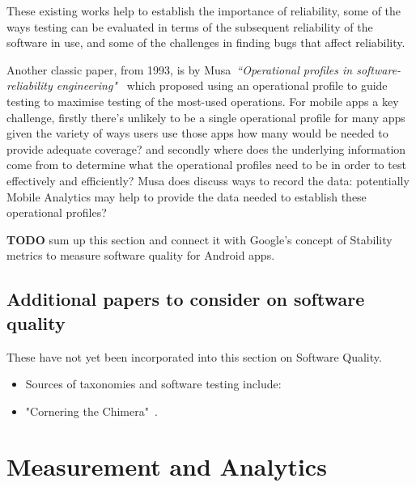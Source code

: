 These existing works help to establish the importance of reliability, some of the ways testing can be evaluated in terms of the subsequent reliability of the software in use, and some of the challenges in finding bugs that affect reliability. 

Another classic paper, from 1993, is by Musa~\emph{``Operational profiles in software-reliability engineering"}~\cite{musa1993_operational_profiles} which proposed using an operational profile to guide testing to maximise testing of the most-used operations. For mobile apps a key challenge, firstly there's unlikely to be a single operational profile for many apps given the variety of ways users use those apps how many would be needed to provide adequate coverage? and secondly where does the underlying information come from to determine what the operational profiles need to be in order to test effectively and efficiently? Musa does discuss ways to record the data: potentially Mobile Analytics may help to provide the data needed to establish these operational profiles? 

\textbf{TODO} sum up this section and connect it with Google's concept of Stability metrics to measure software quality for Android apps.

\subsection{Additional papers to consider on software quality}
These have not yet been incorporated into this section on Software Quality.
\begin{itemize}
    \item Sources of taxonomies and software testing include:~\cite{foidl2018_integrating_software_quality_models_into_risk_based_testing} 
    \item "Cornering the Chimera"~\cite{dromey1996_cornering_the_chimera}.

\end{itemize}

\section{Measurement and Analytics}

